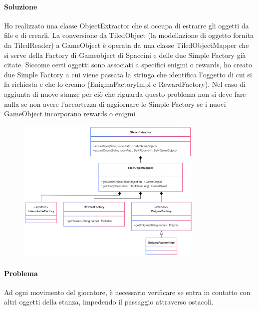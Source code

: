 \documentclass[a4paper,12pt]{report}
\begin{document}
\paragraph{Soluzione} %
Ho realizzato una classe ObjectExtractor che si occupa di estrarre gli oggetti da file e di crearli.
La conversione da TiledObject (la modellazione di oggetto fornita da TiledReader) a GameObject è operata da una classe TiledObjectMapper che si serve della Factory di Gameobject di Spaccini e delle due Simple Factory già citate.
Siccome certi oggetti sono associati a specifici enigmi o rewards, ho creato due Simple Factory a cui viene passata la stringa che identifica l'oggetto di cui si fa richiesta e che lo creano (EnigmaFactoryImpl e RewardFactory).
Nel caso di aggiunta di nuove stanze per ciò che riguarda questo problema non si deve fare nulla se non avere l'accortezza di aggiornare le Simple Factory se i nuovi GameObject incorporano rewards o enigmi

\begin{figure}[h]
    \centering
    \includegraphics[width=0.8\textwidth]{img/ObjExtr.png}
    \label{img:ObjectExtractor}
\end{figure}


\paragraph{Problema} %
Ad ogni movimento del giocatore, è necessario verificare se entra in contatto con altri oggetti della stanza, impedendo il passaggio attraverso ostacoli.
\end{document}
